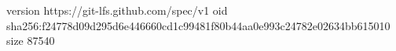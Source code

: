 version https://git-lfs.github.com/spec/v1
oid sha256:f24778d09d295d6e446660cd1c99481f80b44aa0e993c24782e02634bb615010
size 87540
